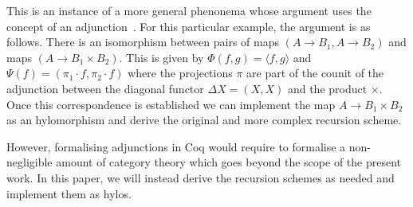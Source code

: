 \documentclass[anonymous, a4paper, UKenglish, cleveref, autoref, thm-restate]{lipics-v2021}
\newcommand{\N}{\mathbb{N}}
\newcommand{\Nat}{\N}
\newcommand{\R}{\mathbb{R}}
\newcommand{\comp}{\cdot}
\newcommand{\operator}[1]{\textsf{#1}}
\newcommand{\pair}[2]{\langle #1, #2 \rangle}
\begin{document}
This is an instance of a more general phenonema whose argument uses the concept
of an adjunction~\cite{MacLane71}.  For this particular example, the argument is
as follows.  There is an isomorphism between pairs of maps
$(A \to B_{1}, A \to B_{2})$ and maps $(A \to B_{1} \times B_{2})$.  This is
given by $\Phi (f,g) = \pair{f}{g}$ and
$\Psi(f) = (\pi_{1} \comp f, \pi_{2} \comp f)$ where the projections $\pi$ are
part of the counit of the adjunction between the diagonal functor
$\Delta X = (X,X)$ and the product $\times$.  Once this correspondence is
established we can implement the map $A \to B_{1} \times B_{2}$ as an
hylomorphism and derive the original and more complex recursion scheme.


However, formalising adjunctions in Coq would require to formalise a
non-negligible amount of category theory which goes beyond the scope of the
present work. In this paper, we will instead derive the recursion schemes as
needed and implement them as hylos.
\end{document}

